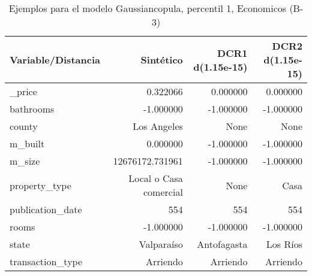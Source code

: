 \begin{table}[H]
\centering
\fontsize{10}{14}\selectfont
\caption{Ejemplos para el modelo Gaussiancopula, percentil 1, Economicos (B-3)}
\label{table-example-economicos-b-3-gaussiancopula-1p}
\begin{tabular}{|l|r|r|r|}
\hline
\rowcolor[gray]{0.8}
Variable/Distancia & Sintético & DCR1 d(1.15e-15) & DCR2 d(1.15e-15) \\
\hline \_price & \cellcolor[rgb]{0.9, 0.54, 0.52} 0.322066 & \cellcolor[rgb]{0.9, 0.54, 0.52} 0.000000 & \cellcolor[rgb]{0.9, 0.54, 0.52} 0.000000 \\
\hline bathrooms & \cellcolor[rgb]{0.9, 0.54, 0.52} -1.000000 & \cellcolor[rgb]{0.9, 0.54, 0.52} -1.000000 & \cellcolor[rgb]{0.9, 0.54, 0.52} -1.000000 \\
\hline county & \cellcolor[rgb]{0.9, 0.54, 0.52} Los Angeles & None & None \\
\hline m\_built & \cellcolor[rgb]{0.9, 0.54, 0.52} 0.000000 & \cellcolor[rgb]{0.9, 0.54, 0.52} -1.000000 & \cellcolor[rgb]{0.9, 0.54, 0.52} -1.000000 \\
\hline m\_size & \cellcolor[rgb]{0.9, 0.54, 0.52} 12676172.731961 & -1.000000 & -1.000000 \\
\hline property\_type & \cellcolor[rgb]{0.9, 0.54, 0.52} Local o Casa comercial & None & Casa \\
\hline publication\_date & \cellcolor[rgb]{0.9, 0.54, 0.52} 554 & \cellcolor[rgb]{0.9, 0.54, 0.52} 554 & \cellcolor[rgb]{0.9, 0.54, 0.52} 554 \\
\hline rooms & \cellcolor[rgb]{0.9, 0.54, 0.52} -1.000000 & \cellcolor[rgb]{0.9, 0.54, 0.52} -1.000000 & \cellcolor[rgb]{0.9, 0.54, 0.52} -1.000000 \\
\hline state & \cellcolor[rgb]{0.9, 0.54, 0.52} Valparaíso & Antofagasta & Los Ríos \\
\hline transaction\_type & \cellcolor[rgb]{0.9, 0.54, 0.52} Arriendo & \cellcolor[rgb]{0.9, 0.54, 0.52} Arriendo & \cellcolor[rgb]{0.9, 0.54, 0.52} Arriendo \\
\hline
\end{tabular}
\end{table}
